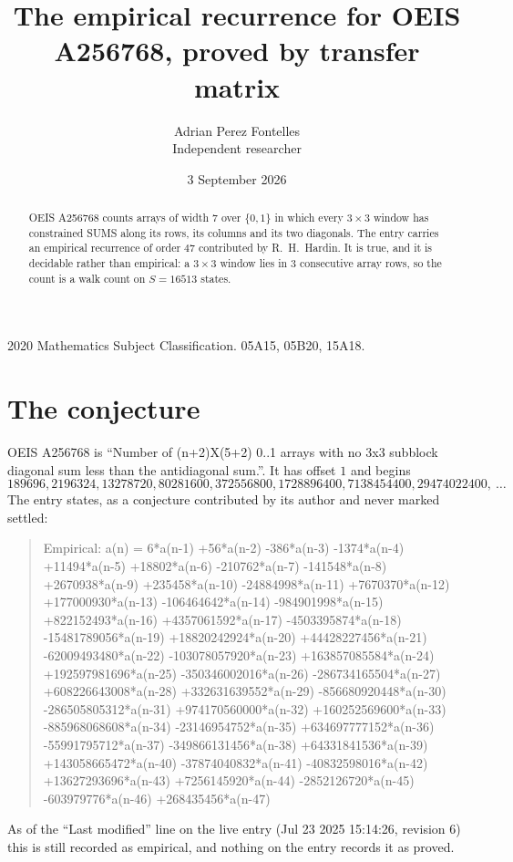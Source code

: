 \documentclass[11pt,a4paper]{article}
\title{The empirical recurrence for OEIS A256768, proved by transfer matrix}
\author{Adrian Perez Fontelles\\ \small Independent researcher}
\date{3 September 2026}
\theoremstyle{plain}
\theoremstyle{definition}
\begin{document}
\maketitle

\begin{abstract}
OEIS A256768 counts arrays of width $7$ over $\{0,1\}$ in which every $3\times3$ window has
constrained SUMS along its rows, its columns and its two diagonals. The entry carries an
empirical recurrence of order $47$ contributed by R.~H.~Hardin. It is true, and it is
decidable rather than empirical: a $3\times3$ window lies in $3$ consecutive array rows,
so the count is a walk count on $S=16513$ states.
\end{abstract}

\noindent\small 2020 Mathematics Subject Classification. 05A15, 05B20, 15A18.\normalsize

\section{The conjecture}

OEIS A256768 is ``Number of (n+2)X(5+2) 0..1 arrays with no 3x3 subblock diagonal sum less than the antidiagonal sum.''. It has offset $1$ and begins
\[
189696, 2196324, 13278720, 80281600, 372556800, 1728896400, 7138454400, 29474022400,\ \dots
\]
The entry states, as a conjecture contributed by its author and never marked settled:
\begin{quote}
Empirical: a(n) = 6*a(n-1) +56*a(n-2) -386*a(n-3) -1374*a(n-4) +11494*a(n-5) +18802*a(n-6) -210762*a(n-7) -141548*a(n-8) +2670938*a(n-9) +235458*a(n-10) -24884998*a(n-11) +7670370*a(n-12) +177000930*a(n-13) -106464642*a(n-14) -984901998*a(n-15) +822152493*a(n-16) +4357061592*a(n-17) -4503395874*a(n-18) -15481789056*a(n-19) +18820242924*a(n-20) +44428227456*a(n-21) -62009493480*a(n-22) -103078057920*a(n-23) +163857085584*a(n-24) +192597981696*a(n-25) -350346002016*a(n-26) -286734165504*a(n-27) +608226643008*a(n-28) +332631639552*a(n-29) -856680920448*a(n-30) -286505805312*a(n-31) +974170560000*a(n-32) +160252569600*a(n-33) -885968068608*a(n-34) -23146954752*a(n-35) +634697777152*a(n-36) -55991795712*a(n-37) -349866131456*a(n-38) +64331841536*a(n-39) +143058665472*a(n-40) -37874040832*a(n-41) -40832598016*a(n-42) +13627293696*a(n-43) +7256145920*a(n-44) -2852126720*a(n-45) -603979776*a(n-46) +268435456*a(n-47)
\end{quote}
As of the ``Last modified'' line on the live entry (Jul 23 2025 15:14:26, revision 6) this is still
recorded as empirical, and nothing on the entry records it as proved.
\end{document}
